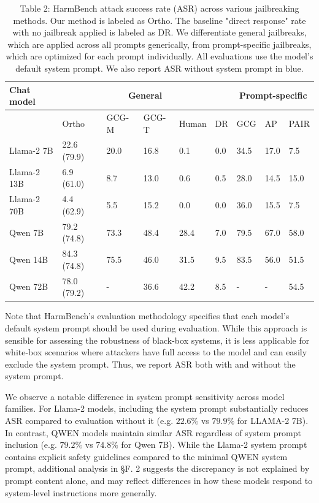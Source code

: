 \documentclass[10pt]{article}
\begin{document}
\begin{table}[h]
\begin{center}
\captionsetup{labelformat=empty}
\caption{Table 2: HarmBench attack success rate (ASR) across various jailbreaking methods. Our method is labeled as Ortho. The baseline "direct response" rate with no jailbreak applied is labeled as DR. We differentiate general jailbreaks, which are applied across all prompts generically, from prompt-specific jailbreaks, which are optimized for each prompt individually. All evaluations use the model's default system prompt. We also report ASR without system prompt in blue.}
\begin{tabular}{|l|l|l|l|l|l|l|l|l|}
\hline
\multirow[b]{2}{*}{Chat model} & \multicolumn{5}{|c|}{General} & \multicolumn{3}{|c|}{Prompt-specific} \\
\hline
 & Ortho & GCG-M & GCG-T & Human & DR & GCG & AP & PAIR \\
\hline
Llama-2 7B & 22.6 (79.9) & 20.0 & 16.8 & 0.1 & 0.0 & 34.5 & 17.0 & 7.5 \\
\hline
Llama-2 13B & 6.9 (61.0) & 8.7 & 13.0 & 0.6 & 0.5 & 28.0 & 14.5 & 15.0 \\
\hline
Llama-2 70B & 4.4 (62.9) & 5.5 & 15.2 & 0.0 & 0.0 & 36.0 & 15.5 & 7.5 \\
\hline
Qwen 7B & 79.2 (74.8) & 73.3 & 48.4 & 28.4 & 7.0 & 79.5 & 67.0 & 58.0 \\
\hline
Qwen 14B & 84.3 (74.8) & 75.5 & 46.0 & 31.5 & 9.5 & 83.5 & 56.0 & 51.5 \\
\hline
Qwen 72B & 78.0 (79.2) & - & 36.6 & 42.2 & 8.5 & - & - & 54.5 \\
\hline
\end{tabular}
\end{center}
\end{table}

Note that HarmBench's evaluation methodology specifies that each model's default system prompt should be used during evaluation. While this approach is sensible for assessing the robustness of black-box systems, it is less applicable for white-box scenarios where attackers have full access to the model and can easily exclude the system prompt. Thus, we report ASR both with and without the system prompt.

We observe a notable difference in system prompt sensitivity across model families. For Llama-2 models, including the system prompt substantially reduces ASR compared to evaluation without it (e.g. $22.6 \%$ vs $79.9 \%$ for LLAMA-2 7B). In contrast, QWEN models maintain similar ASR regardless of system prompt inclusion (e.g. $79.2 \%$ vs $74.8 \%$ for Qwen 7B). While the Llama-2 system prompt contains explicit safety guidelines compared to the minimal QWEN system prompt, additional analysis in §F. 2 suggests the discrepancy is not explained by prompt content alone, and may reflect differences in how these models respond to system-level instructions more generally.
\end{document}
